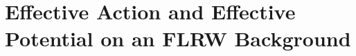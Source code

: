 \chapter{Effective Action and Effective Potential on an FLRW Background}
\label{ch:fT-eff-pot-cosmo}

